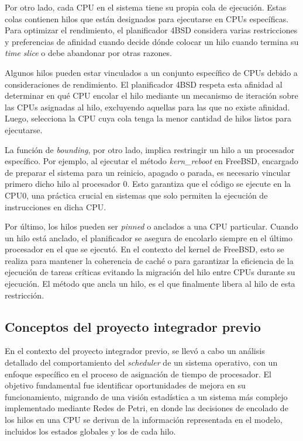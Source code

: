 Por otro lado, cada CPU en el sistema tiene su propia cola de ejecución. Estas colas contienen hilos que están designados para ejecutarse en CPUs específicas. Para optimizar el rendimiento, el planificador 4BSD considera varias restricciones y preferencias de afinidad cuando decide dónde colocar un hilo cuando termina su \textit{time slice} o debe abandonar por otras razones.

Algunos hilos pueden estar vinculados a un conjunto específico de CPUs debido a consideraciones de rendimiento. El planificador 4BSD respeta esta afinidad al determinar en qué CPU encolar el hilo mediante un mecanismo de iteración sobre las CPUs asignadas al hilo, excluyendo aquellas para las que no existe afinidad. Luego, selecciona la CPU cuya cola tenga la menor cantidad de hilos listos para ejecutarse.\par

La función de \textit{bounding}, por otro lado, implica restringir un hilo a un procesador específico. Por ejemplo, al ejecutar el método \textit{kern\_reboot} en FreeBSD, encargado de preparar el sistema para un reinicio, apagado o parada, es necesario vincular primero dicho hilo al procesador 0. Esto garantiza que el código se ejecute en la CPU0, una práctica crucial en sistemas que solo permiten la ejecución de instrucciones en dicha CPU.\par

Por último, los hilos pueden ser \textit{pinned} o anclados a una CPU particular. Cuando un hilo está anclado, el planificador se asegura de encolarlo siempre en el último procesador en el que se ejecutó. En el contexto del kernel de FreeBSD, esto se realiza para mantener la coherencia de caché o para garantizar la eficiencia de la ejecución de tareas críticas evitando la migración del hilo entre CPUs durante su ejecución. El método que ancla un hilo, es el que finalmente libera al hilo de esta restricción.\par

\subsection{Conceptos del proyecto integrador previo}

En el contexto del proyecto integrador previo, se llevó a cabo un análisis detallado del comportamiento del \textit{scheduler} de un sistema operativo, con un enfoque específico en el proceso de asignación de tiempo de procesador. El objetivo fundamental fue identificar oportunidades de mejora en su funcionamiento, migrando de una visión estadística a un sistema más complejo implementado mediante Redes de Petri, en donde las decisiones de encolado de los hilos en una CPU se derivan de la información representada en el modelo, incluidos los estados globales y los de cada hilo.\par

